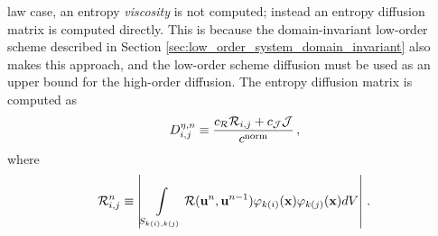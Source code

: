 law case, an entropy \emph{viscosity} is not computed; instead an entropy diffusion
matrix is computed directly. This is because the domain-invariant low-order scheme
described in Section \ref{sec:low_order_system_domain_invariant} also makes
this approach, and the low-order scheme diffusion must be used as an upper bound
for the high-order diffusion. The entropy diffusion matrix is computed as
\begin{equation}
  D^{\eta,n}_{i,j} \equiv
    \frac{c_{\mathcal{R}}\mathcal{R}_{i,j} + c_{\mathcal{J}}\mathcal{J}}
      {c^{\text{norm}}}
  \,,
\end{equation}
where
\begin{equation}
  \mathcal{R}_{i,j}^n \equiv \left|
    \int\limits_{S_{k(i),k(j)}}\mathcal{R}(\mathbf{u}^n,
      \mathbf{u}^{n-1})
      \varphi_{k(i)}(\mathbf{x})\varphi_{k(j)}(\mathbf{x}) dV
    \right|
  \,.
\end{equation}


